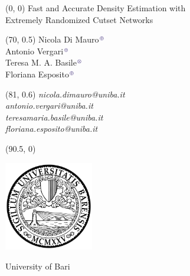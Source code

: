 \documentclass[draft]{beamer}
\newcommand{\summark}{\tiny\textcolor{lacamlilac}{$\boldsymbol{\oplus}$}}
\newcommand{\prodmark}{\tiny\textcolor{lacamlilac}{$\boldsymbol{\otimes}$}}
\begin{document}
\begin{frame}{}
  \begin{textblock}{78}(0, 0)
    \Huge
    Fast and Accurate Density Estimation with\\
    Extremely Randomized Cutset Networks
  \end{textblock}
  \begin{textblock}{40}(70, 0.5)
    \small
    Nicola {Di Mauro}${}^{\text{\summark}}$\\[5pt]
    Antonio Vergari${}^{\text{\summark}}$\\[5pt]
    Teresa M. A. Basile${}^{\text{\prodmark}}$\\[5pt]
    Floriana Esposito${}^{\text{\summark}}$
  \end{textblock}
  \begin{textblock}{30}(81, 0.6)
    \small
    \emph{nicola.dimauro@uniba.it}\\[5pt]
    \emph{antonio.vergari@uniba.it}\\[5pt]
    \emph{teresamaria.basile@uniba.it}\\[5pt]
    \emph{floriana.esposito@uniba.it}
  \end{textblock}
  \begin{textblock}{30}(90.5, 0)
    \scriptsize
    \begin{minipage}[t]{5cm}
      \vspace{0pt}\hspace{15pt}
      \includegraphics[width=110pt]{figures/unibaba}
    \end{minipage}\hspace{-5pt}
    \begin{minipage}[t]{15cm}
    \vspace{30pt}
      \flushleft
      University of Bari\\
    \vspace{2pt}

\end{minipage}
\end{textblock}
\end{frame}
\end{document}
